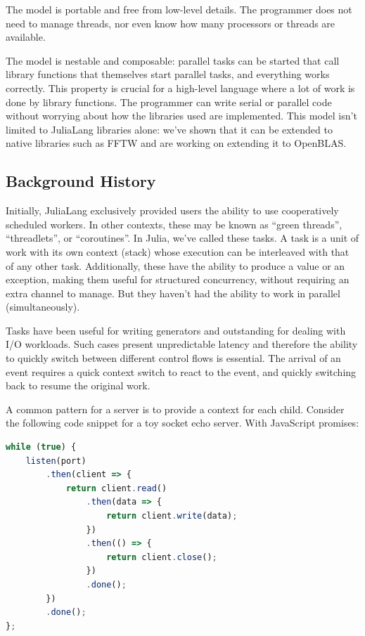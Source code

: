\documentclass{juliacon}
\begin{document}
The model is portable and free from low-level details. The programmer does not need to manage threads, nor even know how many processors or threads are available.

The model is nestable and composable: parallel tasks can be started that call library functions that themselves start parallel tasks, and everything works correctly. This property is crucial for a high-level language where a lot of work is done by library functions. The programmer can write serial or parallel code without worrying about how the libraries used are implemented. This model isn't limited to JuliaLang libraries alone: we've shown that it can be extended to native libraries such as FFTW and are working on extending it to OpenBLAS.


\subsection{Background History}
\label{subsub:background}

Initially, JuliaLang exclusively provided users the ability to use cooperatively scheduled workers. In other contexts, these may be known as ``green threads'', ``threadlets'', or ``coroutines''. In Julia, we've called these tasks. A task is a unit of work with its own context (stack) whose execution can be interleaved with that of any other task. Additionally, these have the ability to produce a value or an exception, making them useful for structured concurrency, without requiring an extra channel to manage. But they haven't had the ability to work in parallel (simultaneously).

Tasks have been useful for writing generators and outstanding for dealing with I/O workloads. Such cases present unpredictable latency and therefore the ability to quickly switch between different control flows is essential. The arrival of an event requires a quick context switch to react to the event, and quickly switching back to resume the original work.

A common pattern for a server is to provide a context for each child. Consider the following code snippet for a toy socket echo server. With JavaScript promises:

\begin{lstlisting}[language = JavaScript]
while (true) {
    listen(port)
        .then(client => {
            return client.read()
                .then(data => {
                    return client.write(data);
                })
                .then(() => {
                    return client.close();
                })
                .done();
        })
        .done();
};
\end{lstlisting}
\end{document}
